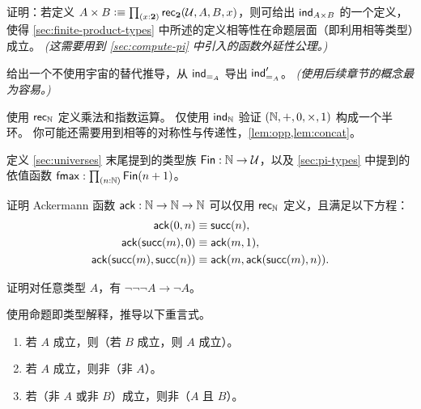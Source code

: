 \begin{ex}\label{ex:prod-via-bool}
%
证明：若定义 $A \times B \defeq \prd{x:\bool}\rec{\bool}(\UU,A,B,x)$，则可给出 $\mathsf{ind}_{A\times B}$ 的一个定义，使得 \cref{sec:finite-product-types} 中所述的定义相等性在命题层面（即利用相等类型）成立。
\emph{(这需要用到 \cref{sec:compute-pi} 中引入的函数外延性公理。)}
\end{ex}

\begin{ex}\label{ex:pm-to-ml}
给出一个不使用宇宙的替代推导，从 $\mathsf{ind}_{=_{A}}$ 导出 $\mathsf{ind}_{=_{A}}'$。
  \emph{(使用后续章节的概念最为容易。)}
\end{ex}

\begin{ex}\label{ex:nat-semiring}
  使用 $\mathsf{rec}_{\mathbb{N}}$ 定义乘法和指数运算。
  仅使用 $\mathsf{ind}_{\mathbb{N}}$ 验证 $(\mathbb{N},+,0,\times,1)$ 构成一个半环。
  你可能还需要用到相等的对称性与传递性，\cref{lem:opp,lem:concat}。
\end{ex}

\begin{ex}\label{ex:fin}
  定义 \cref{sec:universes} 末尾提到的类型族 $\mathsf{Fin} : \mathbb{N} \to \mathcal{U}$，以及 \cref{sec:pi-types} 中提到的依值函数 $\fmax : \prd{n:\nat} \Fin(n+1)$。
\end{ex}

\begin{ex}\label{ex:ackermann}
  证明 Ackermann 函数 $\mathsf{ack} : \mathbb{N} \to \mathbb{N} \to \mathbb{N}$ 可以仅用 $\mathsf{rec}_{\mathbb{N}}$ 定义，且满足以下方程：
  \begin{align*}
    \mathsf{ack}(0,n) &\equiv \mathsf{succ}(n), \\
    \mathsf{ack}(\mathsf{succ}(m),0) &\equiv \mathsf{ack}(m,1), \\
    \mathsf{ack}(\mathsf{succ}(m),\mathsf{succ}(n)) &\equiv \mathsf{ack}(m,\mathsf{ack}(\mathsf{succ}(m),n)).
  \end{align*}
\end{ex}

\begin{ex}\label{ex:neg-ldn}
  证明对任意类型 $A$，有 $\neg\neg\neg A \to \neg A$。
\end{ex}

\begin{ex}\label{ex:tautologies}
  使用命题即类型解释，推导以下重言式。
  \begin{enumerate}
  \item 若 $A$ 成立，则（若 $B$ 成立，则 $A$ 成立）。
  \item 若 $A$ 成立，则非（非 $A$）。
  \item 若（非 $A$ 或非 $B$）成立，则非（$A$ 且 $B$）。
  \end{enumerate}
\end{ex}

